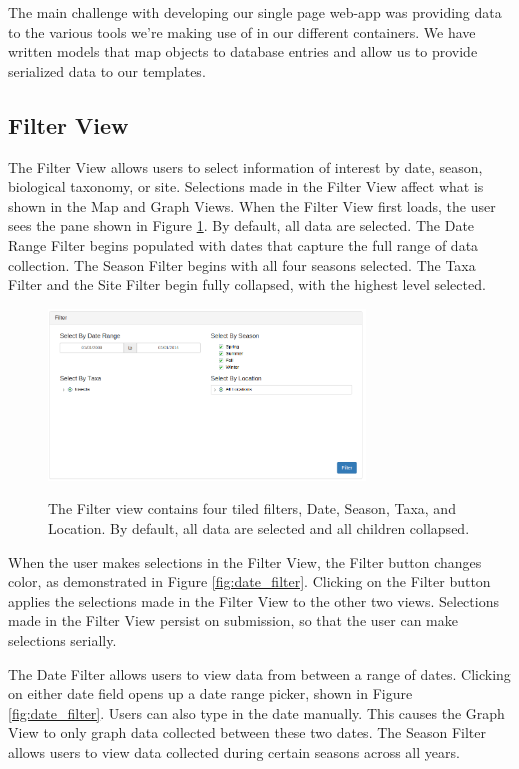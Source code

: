\documentclass[10pt,peerreview,onecolumn,draftclsnofoot,technote]{IEEEtran}
\begin{document}
The main challenge with developing our single page web-app was providing data to the various tools we’re making use of in our different containers.
We have written models that map objects to database entries and allow us to provide serialized data to our templates.

\subsection{Filter View}

The Filter View allows users to select information of interest by date, season, biological taxonomy, or site.
Selections made in the Filter View affect what is shown in the Map and Graph Views.
When the Filter View first loads, the user sees the pane shown in Figure \ref{fig:overall_filter}.
By default, all data are selected.
The Date Range Filter begins populated with dates that capture the full range of data collection.
The Season Filter begins with all four seasons selected.
The Taxa Filter and the Site Filter begin fully collapsed, with the highest level selected.

\begin{figure}[h]
\centering
\includegraphics[width=0.75\textwidth]{images/overall_filter.png}
\label{fig:overall_filter}
\captionsetup{justification=centering}
\caption{
  The Filter view contains four tiled filters, Date, Season, Taxa, and Location.
  By default, all data are selected and all children collapsed.
}
\end{figure}

When the user makes selections in the Filter View, the Filter button changes color, as demonstrated in Figure \ref{fig:date_filter}.
Clicking on the Filter button applies the selections made in the Filter View to the other two views.
Selections made in the Filter View persist on submission, so that the user can make selections serially.

The Date Filter allows users to view data from between a range of dates.
Clicking on either date field opens up a date range picker, shown in Figure \ref{fig:date_filter}.
Users can also type in the date manually.
This causes the Graph View to only graph data collected between these two dates.
The Season Filter allows users to view data collected during certain seasons across all years.
\end{document}
